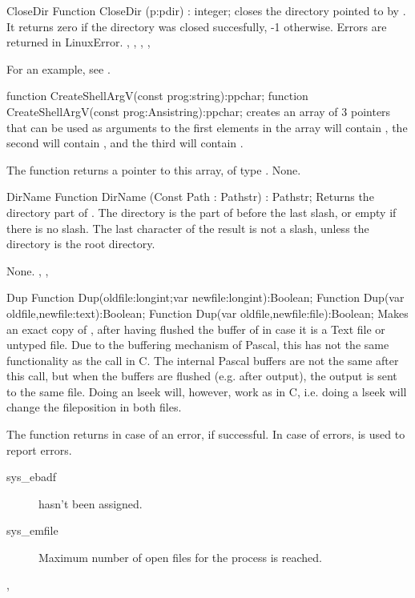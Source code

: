 
\begin{function}{CloseDir}
\Declaration
Function CloseDir (p:pdir) : integer;
\Description
  closes the directory pointed to by .
It returns zero if the directory was closed succesfully, -1 otherwise.
\Errors
Errors are returned in LinuxError.
\SeeAlso
{}, , , ,
\end{function}
For an example, see .

\begin{function}{}
\Declaration
function  CreateShellArgV(const prog:string):ppchar;
function  CreateShellArgV(const prog:Ansistring):ppchar;
\Description
{} creates an array of 3  pointers that can
be used as arguments to  the first elements in the array 
will contain  , the second will contain , and the third
will contain .

The function returns a pointer to this array, of type .
\Errors
None.
\SeeAlso
{}
\end{function}


\begin{function}{DirName}
\Declaration
Function DirName (Const Path : Pathstr) : Pathstr;
\Description
Returns the directory part of .
The directory is the part of  before the last slash,
or empty if there is no slash.
The last character of the result is not a slash, unless the directory is the
root directory.

\Errors
None.
\SeeAlso
{}, , 
\end{function}



\begin{function}{Dup}
\Declaration
Function  Dup(oldfile:longint;var newfile:longint):Boolean;
Function  Dup(var oldfile,newfile:text):Boolean;
Function  Dup(var oldfile,newfile:file):Boolean;
\Description
Makes  an exact copy of , after having flushed the
buffer of  in case it is a Text file or untyped file. 
Due to the buffering mechanism of Pascal, this has not the same functionality
as the  call in C. The internal Pascal buffers are not the same 
after this call, but when the buffers are flushed (e.g. after output), 
the output is sent to the same file.
Doing an lseek will, however, work as in C, i.e. doing a lseek will change 
the fileposition in both files.

The function returns  in case of an error,  if
successful.
\Errors
In case of errors,  is used to report errors.
\begin{description}
\item[sys\_ebadf]  hasn't been assigned.
\item[sys\_emfile] Maximum number of open files for the process is reached.
\end{description}
\SeeAlso
{},  
\end{function}


